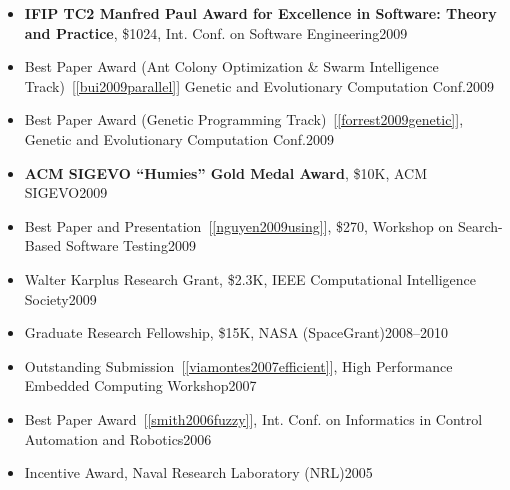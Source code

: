 \documentclass[11pt]{article}
\begin{document}
\begin{itemize}
    \item \textbf{IFIP TC2 Manfred Paul Award for Excellence in Software: Theory and Practice}, \$1024, Int. Conf. on Software Engineering\hfill 2009
    
    
    \item Best Paper Award (Ant Colony Optimization \& Swarm Intelligence Track)~[\ref{bui2009parallel}] Genetic and Evolutionary Computation Conf.\hfill 2009
    \item Best Paper Award (Genetic Programming Track)~[\ref{forrest2009genetic}], Genetic and Evolutionary Computation Conf.\hfill 2009
    \item \textbf{ACM SIGEVO “Humies” Gold Medal Award}, \$10K, ACM SIGEVO\hfill 2009
    \item Best Paper and Presentation~[\ref{nguyen2009using}], \$270, Workshop on Search-Based Software Testing\hfill 2009
    
    
    \item Walter Karplus Research Grant, \$2.3K, IEEE Computational Intelligence Society\hfill 2009
    \item Graduate Research Fellowship, \$15K, NASA (SpaceGrant)\hfill 2008--2010
    \item Outstanding Submission~[\ref{viamontes2007efficient}], High Performance Embedded Computing Workshop\hfill 2007
    \item  Best Paper Award~[\ref{smith2006fuzzy}],  Int. Conf. on Informatics in Control Automation and Robotics\hfill 2006
    \item Incentive Award,  Naval Research Laboratory (NRL)\hfill 2005
\end{itemize}
\end{document}
